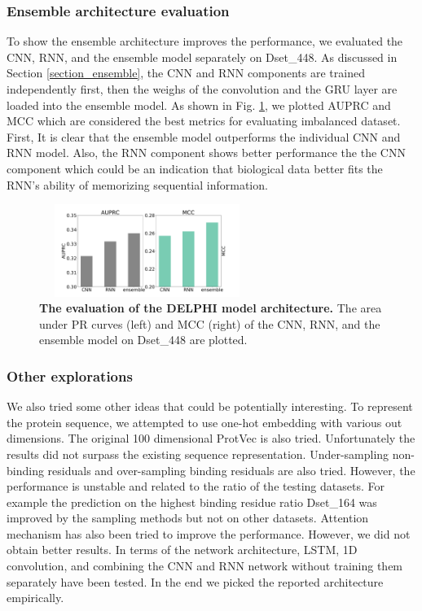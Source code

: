 \documentclass{bioinfo}
\begin{document}
\subsubsection{Ensemble architecture evaluation}
To show the ensemble architecture improves the performance, we evaluated the CNN, RNN, and the ensemble model separately on Dset\_448. As discussed in Section \ref{section_ensemble}, the CNN and RNN components are trained independently first, then the weighs of the convolution and the GRU layer are loaded into the ensemble model. As shown in Fig. \ref{fig_CNN_RNN_ensemble}, we plotted  AUPRC and MCC which are considered the best metrics for evaluating imbalanced dataset. First, It is clear that the ensemble model outperforms the individual CNN and RNN model. Also, the RNN component shows better performance the the CNN component which could be an indication that biological data better fits the RNN's ability of memorizing sequential information.
\begin{figure}
\centering
\includegraphics[width=7cm,height=3cm]{CNN_RNN_ensemble.pdf}
  \caption{\textbf{The evaluation of the DELPHI model architecture.} The area under PR curves (left) and MCC (right) of the CNN, RNN, and the ensemble model on Dset\_448 are plotted.
  \label{fig_CNN_RNN_ensemble}}
\end{figure}

\subsubsection{Other explorations}
We also tried some other ideas that could be potentially interesting. To represent the protein sequence, we attempted to use one-hot embedding with various out dimensions. The original 100 dimensional ProtVec is also tried. Unfortunately the results did not surpass the existing sequence representation. Under-sampling non-binding residuals and over-sampling binding residuals are also tried. However, the performance is unstable and related to the ratio of the testing datasets. For example the prediction on the highest binding residue ratio Dset\_164 was improved by the sampling methods but not on other datasets. Attention mechanism has also been tried to improve the performance. However, we did not obtain better results. In terms of the network architecture, LSTM, 1D convolution, and combining the CNN and RNN network without training them separately have been tested. In the end we picked the reported architecture empirically. 
\end{document}

